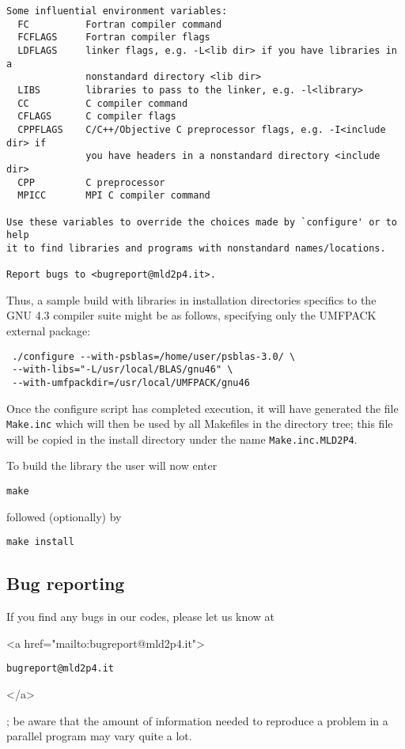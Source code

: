 \begin{verbatim}
Some influential environment variables:
  FC          Fortran compiler command
  FCFLAGS     Fortran compiler flags
  LDFLAGS     linker flags, e.g. -L<lib dir> if you have libraries in a
              nonstandard directory <lib dir>
  LIBS        libraries to pass to the linker, e.g. -l<library>
  CC          C compiler command
  CFLAGS      C compiler flags
  CPPFLAGS    C/C++/Objective C preprocessor flags, e.g. -I<include dir> if
              you have headers in a nonstandard directory <include dir>
  CPP         C preprocessor
  MPICC       MPI C compiler command

Use these variables to override the choices made by `configure' or to help
it to find libraries and programs with nonstandard names/locations.

Report bugs to <bugreport@mld2p4.it>.
\end{verbatim}
Thus, a sample build with libraries in installation
directories specifics to the GNU 4.3 compiler suite might be as
follows, specifying only the UMFPACK external package: 
\begin{verbatim}
 ./configure --with-psblas=/home/user/psblas-3.0/ \
 --with-libs="-L/usr/local/BLAS/gnu46" \
 --with-umfpackdir=/usr/local/UMFPACK/gnu46 
\end{verbatim}
Once the configure script has completed execution, it will have
generated the file \verb|Make.inc| which will then be used by all
Makefiles in the directory tree; this file will be copied in the
install directory under the name \verb|Make.inc.MLD2P4|.

To build the library the user will now enter 
\begin{verbatim}
make
\end{verbatim}
followed (optionally) by 
\begin{verbatim}
make install
\end{verbatim}
\subsection{Bug reporting}
If you find any bugs in our codes, please let us know at
\begin{rawhtml}
<a href="mailto:bugreport@mld2p4.it">
\end{rawhtml}
\texttt{bugreport@mld2p4.it}
\begin{rawhtml}
</a>
\end{rawhtml}
; be aware that  
the amount of information needed to reproduce a problem in a parallel
program may vary quite a lot. 
